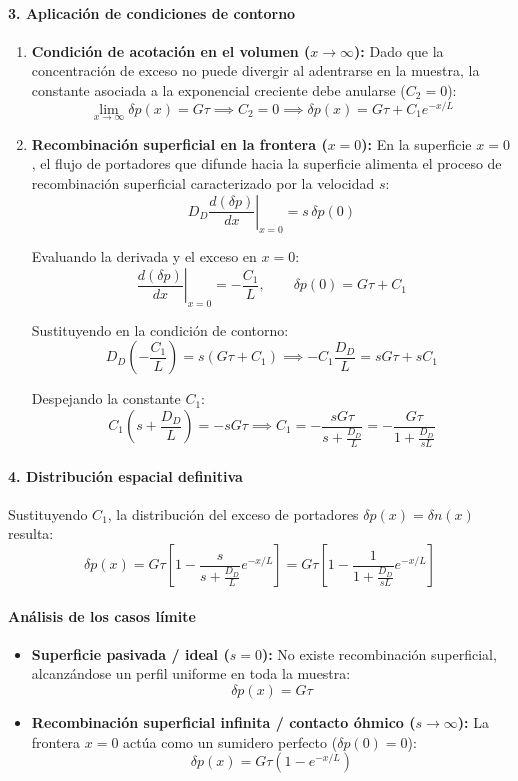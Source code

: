 \begin{problema}
\paragraph{3. Aplicación de condiciones de contorno}
\begin{enumerate}[label=\alph*)]
    \item \textbf{Condición de acotación en el volumen ($x \to \infty$):}
    Dado que la concentración de exceso no puede divergir al adentrarse en la muestra, la constante asociada a la exponencial creciente debe anularse ($C_2 = 0$):
    \[
    \lim_{x \to \infty} \delta p(x) = G \tau \implies C_2 = 0 \implies \delta p(x) = G \tau + C_1 e^{-x/L}
    \]

    \item \textbf{Recombinación superficial en la frontera ($x = 0$):}
    En la superficie $x = 0$, el flujo de portadores que difunde hacia la superficie alimenta el proceso de recombinación superficial caracterizado por la velocidad $s$:
    \[
    D_D \left. \frac{d(\delta p)}{dx} \right|_{x=0} = s \, \delta p(0)
    \]

    Evaluando la derivada y el exceso en $x = 0$:
    \[
    \left. \frac{d(\delta p)}{dx} \right|_{x=0} = -\frac{C_1}{L}, \qquad \delta p(0) = G \tau + C_1
    \]

    Sustituyendo en la condición de contorno:
    \[
    D_D \left(-\frac{C_1}{L}\right) = s (G \tau + C_1) \implies -C_1 \frac{D_D}{L} = s G \tau + s C_1
    \]

    Despejando la constante $C_1$:
    \[
    C_1 \left(s + \frac{D_D}{L}\right) = -s G \tau \implies C_1 = -\frac{s G \tau}{s + \frac{D_D}{L}} = -\frac{G \tau}{1 + \frac{D_D}{s L}}
    \]
\end{enumerate}

\paragraph{4. Distribución espacial definitiva}
Sustituyendo $C_1$, la distribución del exceso de portadores $\delta p(x) = \delta n(x)$ resulta:
\[
\delta p(x) = G \tau \left[ 1 - \frac{s}{s + \frac{D_D}{L}} e^{-x/L} \right] = G \tau \left[ 1 - \frac{1}{1 + \frac{D_D}{s L}} e^{-x/L} \right]
\]

\paragraph{Análisis de los casos límite}
\begin{itemize}
    \item \textbf{Superficie pasivada / ideal ($s = 0$):} No existe recombinación superficial, alcanzándose un perfil uniforme en toda la muestra:
    \[
    \delta p(x) = G \tau
    \]
    \item \textbf{Recombinación superficial infinita / contacto óhmico ($s \to \infty$):} La frontera $x = 0$ actúa como un sumidero perfecto ($\delta p(0) = 0$):
    \[
    \delta p(x) = G \tau \left( 1 - e^{-x/L} \right)    \]
\end{itemize}


\end{problema}
